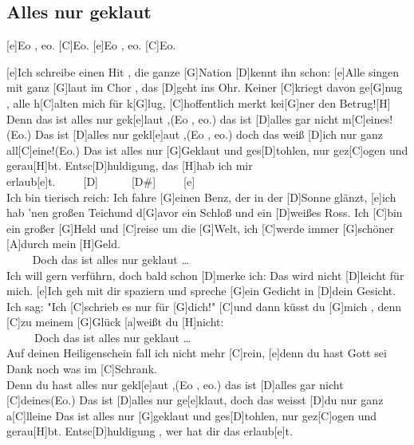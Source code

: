 \documentclass[10pt,a5paper,twoside]{scrbook}
\begin{document}
\subsection{Alles nur geklaut}
\begin{guitar}

[e]Eo , eo. [C]Eo. [e]Eo , eo. [C]Eo.

[e]Ich schreibe einen Hit , die ganze [G]Nation [D]kennt ihn schon:
[e]Alle singen mit ganz [G]laut im Chor , das [D]geht ins Ohr.
Keiner [C]kriegt davon ge[G]nug , alle h[C]alten mich für k[G]lug,
[C]hoffentlich merkt kei[G]ner den Betrug![H]
\\
Denn das ist alles nur gek[e]laut ,(Eo , eo.) das ist [D]alles gar nicht m[C]eines!(Eo.)
Das ist [D]alles nur gekl[e]aut ,(Eo , eo.) doch das weiß [D]ich nur ganz all[C]eine!(Eo.)
Das ist alles nur [G]Geklaut und ges[D]tohlen, nur gez[C]ogen und gerau[H]bt.
Entsc[D]huldigung, das [H]hab ich mir erlaub[e]t.~~~~~[D]~~~~~~[D#]~~~~~[e]
\\
[e]Ich bin tierisch reich: Ich fahre [G]einen Benz, der in der [D]Sonne glänzt,
[e]ich hab 'nen großen Teichund d[G]avor ein Schloß und ein [D]weißes Ross. 
Ich [C]bin ein großer [G]Held und [C]reise um die [G]Welt, 
ich [C]werde immer [G]schöner [A]durch mein [H]Geld.
\\
~~~~ Doch das ist alles nur geklaut \ldots
\\
[e]Ich will gern verführn, doch bald schon [D]merke ich: Das wird nicht [D]leicht für mich. 
[e]Ich geh mit dir spaziern und spreche [G]ein Gedicht in [D]dein Gesicht. 
Ich sag: "Ich [C]schrieb es nur für [G]dich!" [C]und dann küsst du [G]mich , 
denn [C]zu meinem [G]Glück [a]weißt du [H]nicht:
\\
~~~~~Doch das ist alles nur geklaut \ldots
\\
[e]Auf deinen Heiligenschein fall ich nicht mehr [C]rein,
[e]denn du hast Gott sei Dank noch was im [C]Schrank.
\\
Denn du hast alles nur gekl[e]aut ,(Eo , eo.)  das ist [D]alles gar nicht [C]deines(Eo.)
Das ist [D]alles nur ge[e]klaut, doch das weisst [D]du nur ganz a[C]lleine
Das ist alles nur [G]geklaut und ges[D]tohlen, nur gez[C]ogen und gerau[H]bt.
Entsc[D]huldigung , wer hat dir das erlaub[e]t.
\end{guitar}

  	
\newpage  

  	
\end{document}
